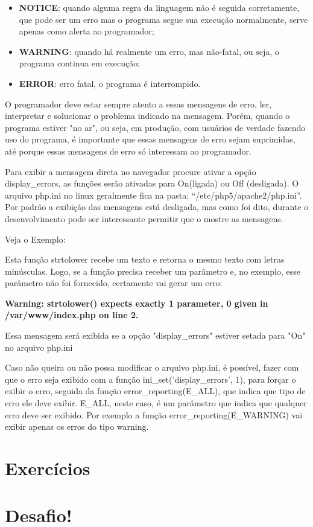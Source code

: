 \begin{itemize}
  \item \textbf{NOTICE}: quando alguma regra da linguagem não é seguida corretamente, que pode ser um erro mas o programa segue sua execução normalmente, serve apenas como alerta ao programador;
  \item \textbf{WARNING}: quando há realmente um erro, mas não-fatal, ou seja, o programa continua em execução;
  \item \textbf{ERROR}: erro fatal, o programa é interrompido.
\end{itemize}

O programador \php deve estar sempre atento a essas mensagens de erro, ler, interpretar e solucionar o problema indicado na mensagem. Porém, quando o programa estiver "no ar", ou seja, em produção, com usuários de verdade fazendo uso do programa, é importante que essas mensagens de erro sejam suprimidas, até porque essas mensagens de erro só interessam ao programador.

Para exibir a mensagem direta no navegador procure ativar a opção display_errors, as funções serão ativadas para On(ligada) ou Off (desligada). O arquivo php.ini no linux geralmente fica na pasta: “/etc/php5/apache2/php.ini”. Por padrão a exibição das mensagens está desligada, mas como foi dito, durante o desenvolvimento pode ser interessante permitir que o \php mostre as mensagens.

Veja o Exemplo:



Esta função strtolower recebe um texto e retorna o mesmo texto com letras minúsculas. Logo, se a função precisa receber um parâmetro e, no exemplo, esse parâmetro não foi fornecido, certamente vai gerar um erro:

\textbf{Warning: strtolower() expects exactly 1 parameter, 0 given in /var/www/index.php on line 2.}

Essa mensagem será exibida se a opção "display_errors" estiver setada para "On" no arquivo php.ini

Caso não queira ou não possa modificar o arquivo php.ini, é possível, fazer com que o erro seja exibido com a função ini_set('display_errors', 1), para forçar o \php exibir o erro, seguida da função error_reporting(E_ALL), que indica que tipo de erro ele deve exibir. E_ALL, neste caso, é um parâmetro que indica que qualquer erro deve ser exibido. Por exemplo a função error_reporting(E_WARNING) vai exibir apenas os erros do tipo warning.




\section{Exercícios}
\label{cap9-exercicios}

\section{Desafio!}
\label{cap9-desafio}